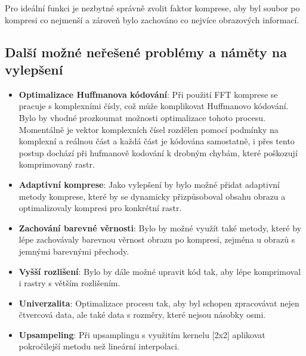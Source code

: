Pro ideální funkci je nezbytné správně zvolit faktor komprese, aby byl soubor po kompresi co nejmenší a zároveň bylo zachováno co nejvíce obrazových informací.

\subsection*{Další možné neřešené problémy a náměty na vylepšení}

\begin{itemize}
    \item \textbf{Optimalizace Huffmanova kódování}: Při použití FFT komprese se pracuje s komplexními čísly, což může komplikovat Huffmanovo kódování. Bylo by vhodné prozkoumat možnosti optimalizace tohoto procesu. Momentálně je vektor komplexních čísel rozdělen pomocí podmínky na komplexní a reálnou část a každá část je kódována samostatně, i přes tento postup dochází při hufmanově kodování k drobným chybám, které poškozují komprimovaný rastr.
    \item \textbf{Adaptivní komprese}: Jako vylepšení by bylo možné přidat adaptivní metody komprese, které by se dynamicky přizpůsoboval obsahu obrazu a optimalizovaly kompresi pro konkrétní rastr.
    \item \textbf{Zachování barevné věrnosti}: Bylo by možné využít také metody, které by lépe zachovávaly barevnou věrnost obrazu po kompresi, zejména u obrazů s jemnými barevnými přechody.
    \item \textbf{Vyšší rozlišení}: Bylo by dále možné upravit kód tak, aby lépe komprimoval i rastry s větším rozlišením.
    \item \textbf{Univerzalita}: Optimalizace procesu tak, aby byl schopen zpracovávat nejen čtvercová data, ale také data s rozměry, které nejsou násobky osmi.
    \item \textbf{Upsampeling}: Při upsamplingu s využitím kernelu [2x2] aplikovat pokročilejší metodu než lineární interpolaci.
\end{itemize}
